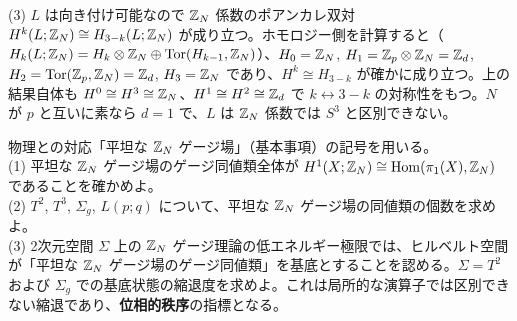 \begin{solution}
(3) $L$ は向き付け可能なので $\mathbb{Z}_N$ 係数のポアンカレ双対 $H^k(L;\mathbb{Z}_N)\cong H_{3-k}(L;\mathbb{Z}_N)$ が成り立つ。ホモロジー側を計算すると（$H_k(L;\mathbb{Z}_N)=H_k\otimes\mathbb{Z}_N\oplus\operatorname{Tor}(H_{k-1},\mathbb{Z}_N)$）、$H_0=\mathbb{Z}_N$, $H_1=\mathbb{Z}_p\otimes\mathbb{Z}_N=\mathbb{Z}_d$, $H_2=\operatorname{Tor}(\mathbb{Z}_p,\mathbb{Z}_N)=\mathbb{Z}_d$, $H_3=\mathbb{Z}_N$ であり、$H^k\cong H_{3-k}$ が確かに成り立つ。上の結果自体も $H^0\cong H^3\cong\mathbb{Z}_N$、$H^1\cong H^2\cong\mathbb{Z}_d$ で $k\leftrightarrow3-k$ の対称性をもつ。$N$ が $p$ と互いに素なら $d=1$ で、$L$ は $\mathbb{Z}_N$ 係数では $S^3$ と区別できない。
\end{solution}

\begin{problem}[難易度 B]\label{ch06-prob-zn}
物理との対応「平坦な $\mathbb{Z}_N$ ゲージ場」（基本事項）の記号を用いる。\\
(1) 平坦な $\mathbb{Z}_N$ ゲージ場のゲージ同値類全体が $H^1(X;\mathbb{Z}_N)\cong\operatorname{Hom}(\pi_1(X),\mathbb{Z}_N)$ であることを確かめよ。\\
(2) $T^2$, $T^3$, $\Sigma_g$, $L(p;q)$ について、平坦な $\mathbb{Z}_N$ ゲージ場の同値類の個数を求めよ。\\
(3) 2次元空間 $\Sigma$ 上の $\mathbb{Z}_N$ ゲージ理論の低エネルギー極限では、ヒルベルト空間が「平坦な $\mathbb{Z}_N$ ゲージ場のゲージ同値類」を基底とすることを認める。$\Sigma=T^2$ および $\Sigma_g$ での基底状態の縮退度を求めよ。これは局所的な演算子では区別できない縮退であり、\textbf{位相的秩序}の指標となる。
\end{problem}

